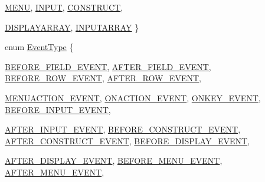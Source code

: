 \begin{DoxyCompactItemize}
\hyperlink{namespaceFgl_a66700792cb225549384ae76c1057cf22add52348d516c9d5ba9da08a3052ca40f}{MENU}, 
\hyperlink{namespaceFgl_a66700792cb225549384ae76c1057cf22a44a7ee3ee0989f85b0255ee91e59b423}{INPUT}, 
\hyperlink{namespaceFgl_a66700792cb225549384ae76c1057cf22a134ea7c57c8ce8a226bb57a3bdfc5733}{CONSTRUCT}, 
\par
\hyperlink{namespaceFgl_a66700792cb225549384ae76c1057cf22ab019b8d80dc5cce02f0596c7ff252301}{DISPLAYARRAY}, 
\hyperlink{namespaceFgl_a66700792cb225549384ae76c1057cf22a6e1b247a5050ed29e7fe7cc74b307f12}{INPUTARRAY}
 \}
\item 
enum \hyperlink{namespaceFgl_a7bbae69263a5d0012370d5cbb859c6a8}{EventType} \{ \par
\hyperlink{namespaceFgl_a7bbae69263a5d0012370d5cbb859c6a8aaf4eb493493e5b9144388bd3c6f0a56c}{BEFORE\_\-FIELD\_\-EVENT}, 
\hyperlink{namespaceFgl_a7bbae69263a5d0012370d5cbb859c6a8a67f55478b8f692065b1e223dd8545e4a}{AFTER\_\-FIELD\_\-EVENT}, 
\hyperlink{namespaceFgl_a7bbae69263a5d0012370d5cbb859c6a8aea412ca359de2c03baab7cc6ca4a856d}{BEFORE\_\-ROW\_\-EVENT}, 
\hyperlink{namespaceFgl_a7bbae69263a5d0012370d5cbb859c6a8a192a36fae78f7c2b331f3c5b17008953}{AFTER\_\-ROW\_\-EVENT}, 
\par
\hyperlink{namespaceFgl_a7bbae69263a5d0012370d5cbb859c6a8aadd05cc475d2e51c57c4553b63803968}{MENUACTION\_\-EVENT}, 
\hyperlink{namespaceFgl_a7bbae69263a5d0012370d5cbb859c6a8afe3e39bf7df01f76a4a60b1e6dcd2bfb}{ONACTION\_\-EVENT}, 
\hyperlink{namespaceFgl_a7bbae69263a5d0012370d5cbb859c6a8af817e5d09a4d5de55281399b45834dc4}{ONKEY\_\-EVENT}, 
\hyperlink{namespaceFgl_a7bbae69263a5d0012370d5cbb859c6a8a21dd52adcd2a31f98f449b968b4a1c56}{BEFORE\_\-INPUT\_\-EVENT}, 
\par
\hyperlink{namespaceFgl_a7bbae69263a5d0012370d5cbb859c6a8a7f05c979746799947b4015c3be33a8ec}{AFTER\_\-INPUT\_\-EVENT}, 
\hyperlink{namespaceFgl_a7bbae69263a5d0012370d5cbb859c6a8ab056b5777c51c6b03d41ad65f9dc0592}{BEFORE\_\-CONSTRUCT\_\-EVENT}, 
\hyperlink{namespaceFgl_a7bbae69263a5d0012370d5cbb859c6a8ab308df2a3cd3f5a4a7d92d4f8119e2a8}{AFTER\_\-CONSTRUCT\_\-EVENT}, 
\hyperlink{namespaceFgl_a7bbae69263a5d0012370d5cbb859c6a8a50c41c5932fc33375d56004132e8c727}{BEFORE\_\-DISPLAY\_\-EVENT}, 
\par
\hyperlink{namespaceFgl_a7bbae69263a5d0012370d5cbb859c6a8a81671dcd6d04932d2684a112a0cb3874}{AFTER\_\-DISPLAY\_\-EVENT}, 
\hyperlink{namespaceFgl_a7bbae69263a5d0012370d5cbb859c6a8aa540c14b4c4a3da46fa872ec88e1e0ec}{BEFORE\_\-MENU\_\-EVENT}, 
\hyperlink{namespaceFgl_a7bbae69263a5d0012370d5cbb859c6a8a2acee749adc43054a12bd6fdb3edda53}{AFTER\_\-MENU\_\-EVENT}, 

\end{DoxyCompactItemize}
